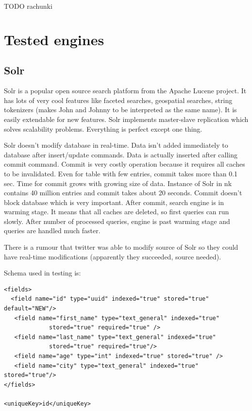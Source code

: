 \documentclass[10pt,a4paper]{article}
\begin{document}
TODO rachunki


\section{Tested engines}
\subsection{Solr}

Solr is a popular open source search platform from the Apache Lucene project. It has lots of very cool features like faceted searches, geospatial searches, string tokenizers (makes John and Johnny to be interpreted as the same name). It is easily extendable for new features. Solr implements master-slave replication which solves scalability problems. Everything is perfect except one thing. 

Solr doesn't modify database in real-time. Data isn't added immediately to database after insert/update commands. Data is actually inserted after calling commit command. Commit is very costly operation because it requires all caches to be invalidated. Even for table with few entries, commit takes more than 0.1 sec. Time for commit grows with growing size of data. Instance of Solr in nk contains 40 million entries and commit takes about 20 seconds. Commit doesn't block database which is very important. After commit, search engine is in warming stage. It means that all caches are deleted, so first queries can run slowly. After number of processed queries, engine is past warming stage and queries are handled much faster.

There is a rumour that twitter was able to modify source of Solr so they could have real-time modifications (apparently they succeeded, source needed).

Schema used in testing is:

\begin{lstlisting}
<fields>
  <field name="id" type="uuid" indexed="true" stored="true" default="NEW"/>
   <field name="first_name" type="text_general" indexed="true"
             stored="true" required="true" /> 
   <field name="last_name" type="text_general" indexed="true" 
             stored="true" required="true"/>
   <field name="age" type="int" indexed="true" stored="true" /> 
   <field name="city" type="text_general" indexed="true" stored="true"/>
</fields>

<uniqueKey>id</uniqueKey> 
\end{lstlisting}
\end{document}
